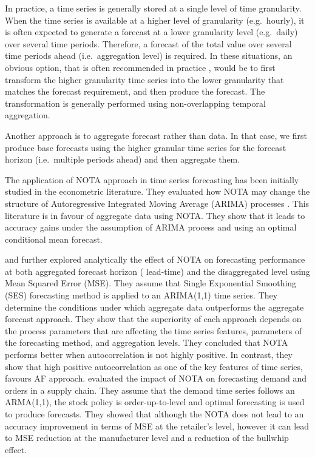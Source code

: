 \documentclass[preprint, 3p,
authoryear]{elsarticle} %
\begin{document}
In practice, a time series is generally stored at a single level of time
granularity. When the time series is available at a higher level of
granularity (e.g.~hourly), it is often expected to generate a forecast
at a lower granularity level (e.g.~daily) over several time periods.
Therefore, a forecast of the total value over several time periods ahead
(i.e.~aggregation level) is required. In these situations, an obvious
option, that is often recommended in practice \citep{goodwin2018profit},
would be to first transform the higher granularity time series into the
lower granularity that matches the forecast requirement, and then
produce the forecast. The transformation is generally performed using
non-overlapping temporal aggregation.

Another approach is to aggregate forecast rather than data. In that
case, we first produce base forecasts using the higher granular time
series for the forecast horizon (i.e.~multiple periods ahead) and then
aggregate them.

The application of NOTA approach in time series forecasting has been
initially studied in the econometric literature. They evaluated how NOTA
may change the structure of Autoregressive Integrated Moving Average
(ARIMA) processes \citep{wei1978some, rossana1995temporal}. This
literature is in favour of aggregate data using NOTA. They show that it
leads to accuracy gains under the assumption of ARIMA process and using
an optimal conditional mean forecast.

\citet{rostami2013demand} and \citet{rostami2014note} further explored
analytically the effect of NOTA on forecasting performance at both
aggregated forecast horizon ( lead-time) and the disaggregated level
using Mean Squared Error (MSE). They assume that Single Exponential
Smoothing (SES) forecasting method is applied to an ARIMA(1,1) time
series. They determine the conditions under which aggregate data
outperforms the aggregate forecast approach. They show that the
superiority of each approach depends on the process parameters that are
affecting the time series features, parameters of the forecasting
method, and aggregation levels. They concluded that NOTA performs better
when autocorrelation is not highly positive. In contrast, they show that
high positive autocorrelation as one of the key features of time series,
favours AF approach. \citet{rostami2019impact} evaluated the impact of
NOTA on forecasting demand and orders in a supply chain. They assume
that the demand time series follows an ARMA(1,1), the stock policy is
order-up-to-level and optimal forecasting is used to produce forecasts.
They showed that although the NOTA does not lead to an accuracy
improvement in terms of MSE at the retailer's level, however it can lead
to MSE reduction at the manufacturer level and a reduction of the
bullwhip effect.
\end{document}
